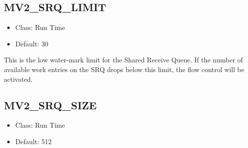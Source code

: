 % 
% 

\subsection{MV2\_SRQ\_LIMIT}
\label{def:nem-viadev-srq-limit}

\begin{itemize}
    \item Class: Run Time
    \item Default: 30
\end{itemize}

This is the low water-mark limit for the
Shared Receive Queue. If the
number of available work entries on the
SRQ drops below this limit, the
flow control will be activated.


\subsection{MV2\_SRQ\_SIZE}
\label{def:nem-viadev-srq-size}

\begin{itemize}
    \item Class: Run Time
    \item Default: 512
\end{itemize}


